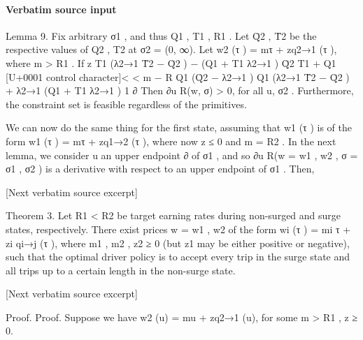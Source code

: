 \documentclass[10pt]{article}
\begin{document}
\paragraph{Verbatim source input}
\begin{ReviewVerbatim}
Lemma 9. Fix arbitrary σ1 , and thus Q1 , T1 , R1 . Let Q̄2 , T̄2 be the respective values of Q2 , T2 at
σ2 = (0, ∞). Let w2 (τ ) = mτ + zq2→1 (τ ), where m > R1 .
If
z
T1 (λ2→1 T̄2 − Q̄2 ) − (Q1 + T1 λ2→1 )
Q̄2 T1 + Q1
[U+0001 control character]<
<
m
−
R
Q1 (Q̄2 − λ2→1 )
Q1 (λ2→1 T̄2 − Q̄2 ) + λ2→1 (Q1 + T1 λ2→1 )
1
∂
Then ∂u
R(w, σ) > 0, for all u, σ2 . Furthermore, the constraint set is feasible regardless of the
primitives.

We can now do the same thing for the first state, assuming that w1 (τ ) is of the form w1 (τ ) =
mτ + zq1→2 (τ ), where now z ≤ 0 and m = R2 . In the next lemma, we consider u an upper endpoint
∂
of σ1 , and so ∂u
R(w = {w1 , w2 }, σ = {σ1 , σ2 }) is a derivative with respect to an upper endpoint of
σ1 . Then,

[Next verbatim source excerpt]

Theorem 3. Let R1 < R2 be target earning rates during non-surged and surge states, respectively.
There exist prices w = {w1 , w2 } of the form
wi (τ ) = mi τ + zi qi→j (τ ),
where m1 , m2 , z2 ≥ 0 (but z1 may be either positive or negative), such that the optimal driver policy
is to accept every trip in the surge state and all trips up to a certain length in the non-surge state.

[Next verbatim source excerpt]

Proof. Proof.
Suppose we have w2 (u) = mu + zq2→1 (u), for some m > R1 , z ≥ 0.
\end{ReviewVerbatim}
\end{document}
